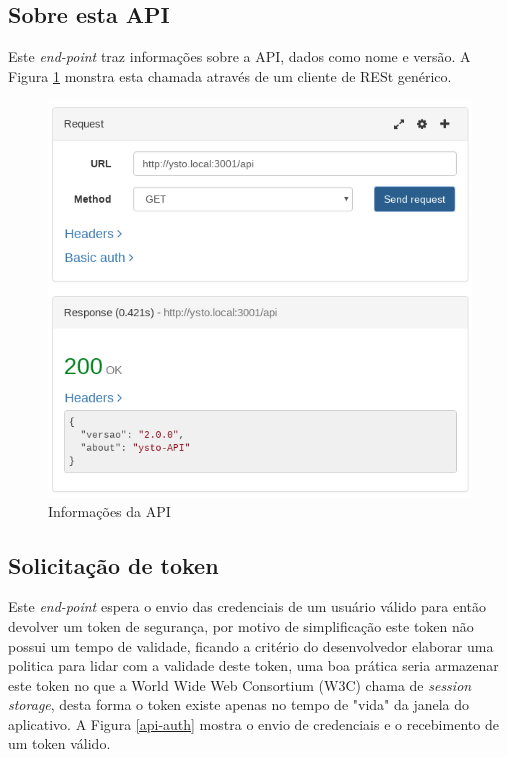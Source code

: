 \subsection{Sobre esta API}
Este \textit{end-point} traz informações sobre a API, dados como nome e versão. A Figura \ref{api-about} monstra esta chamada através de um cliente de RESt genérico.

\begin{figure}[H]
\caption{\label{api-about} Informações da API}
\includegraphics[scale=0.35]{img/05-api-about.png}
\end{figure}

\subsection{Solicitação de token}
Este \textit{end-point} espera o envio das credenciais de um usuário válido para então devolver um token de segurança, por motivo de simplificação este token não possui um tempo de validade, ficando a critério do desenvolvedor elaborar uma politica para lidar com a validade deste token, uma boa prática seria armazenar este token no que a World Wide Web Consortium (W3C) chama de \textit{session storage}, desta forma o token existe apenas no tempo de "vida" da janela do aplicativo. A Figura \ref{api-auth} mostra o envio de credenciais e o recebimento de um token válido.

